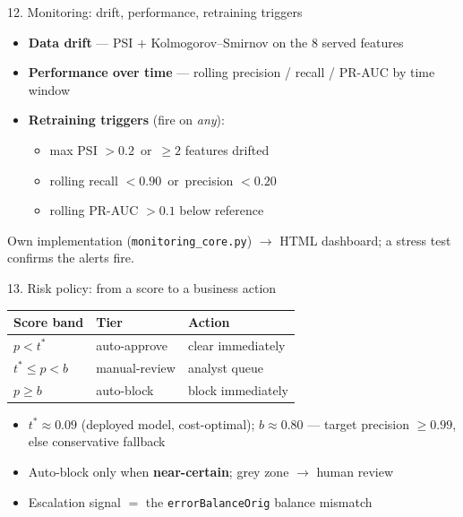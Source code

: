 \documentclass[aspectratio=169]{beamer}
\newcommand{\good}[1]{\textcolor{good}{\textbf{#1}}}
\begin{document}
\begin{frame}{12. Monitoring: drift, performance, retraining triggers}
\begin{itemize}
    \item \textbf{Data drift} --- PSI $+$ Kolmogorov--Smirnov on the 8 served features
    \item \textbf{Performance over time} --- rolling precision / recall / PR-AUC by time window
    \item \textbf{Retraining triggers} (fire on \emph{any}):
    \begin{itemize}
        \item max PSI $> 0.2$\, or\, $\ge 2$ features drifted
        \item rolling recall $< 0.90$\, or\, precision $< 0.20$
        \item rolling PR-AUC $> 0.1$ below reference
    \end{itemize}
\end{itemize}
\vspace{0.3em}
\centering
Own implementation (\texttt{monitoring\_core.py}) $\to$ HTML dashboard;
a stress test confirms the alerts fire.
\end{frame}

\begin{frame}{13. Risk policy: from a score to a business action}
\centering
\begin{tabular}{lll}
\toprule
Score band & Tier & Action \\
\midrule
$p < t^{*}$ & auto-approve & clear immediately \\
$t^{*} \le p < b$ & manual-review & analyst queue \\
$p \ge b$ & auto-block & block immediately \\
\bottomrule
\end{tabular}
\vspace{0.8em}
\begin{itemize}
    \item $t^{*} \approx 0.09$ (deployed model, cost-optimal); \good{$b \approx 0.80$} --- target precision $\ge 0.99$, else conservative fallback
    \item Auto-block only when \textbf{near-certain}; grey zone $\to$ human review
    \item Escalation signal $=$ the \texttt{errorBalanceOrig} balance mismatch
\end{itemize}
\end{frame}
\end{document}
